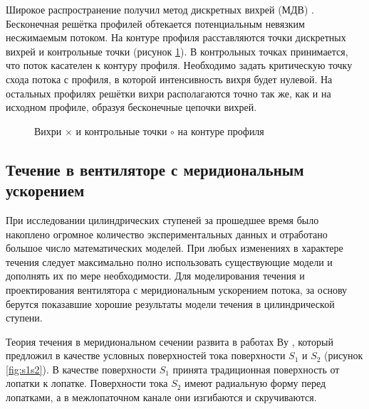 Широкое распространение получил метод дискретных вихрей (МДВ) \cite{Belozerovskiy1978}. Бесконечная решётка профилей обтекается потенциальным невязким несжимаемым потоком. На контуре профиля расставляются точки дискретных вихрей и контрольные точки (рисунок \ref{fig:foilVortex}). В контрольных точках принимается, что поток касателен к контуру профиля. Необходимо задать критическую точку схода потока с профиля, в которой интенсивность вихря будет нулевой. На остальных профилях решётки вихри располагаются точно так же, как и на исходном профиле, образуя бесконечные цепочки вихрей. 

\begin{figure} [ht]
	\caption{Вихри \(\times\) и контрольные точки \(\circ\) на контуре профиля} 
	\label{fig:foilVortex}
\end{figure}

\subsection{Течение в вентиляторе с меридиональным ускорением}\label{sec:ch1/mrdnl}

При исследовании цилиндрических ступеней за прошедшее время было накоплено огромное количество экспериментальных данных и отработано большое число математических моделей. При любых изменениях в характере течения следует максимально полно использовать существующие модели и дополнять их по мере необходимости. Для моделирования течения и проектирования вентилятора с меридиональным ускорением потока, за основу берутся показавшие хорошие результаты модели течения в цилиндрической ступени.

Теория течения в меридиональном сечении развита в работах Ву \cite{Wu1952}, который предложил в качестве условных поверхностей тока поверхности \(S_1\) и \(S_2\) (рисунок \ref{fig:s1s2}). В качестве поверхности \(S_1\) принята традиционная поверхность от лопатки к лопатке. Поверхности тока \(S_2\) имеют радиальную форму перед лопатками, а в межлопаточном канале они изгибаются и скручиваются.

